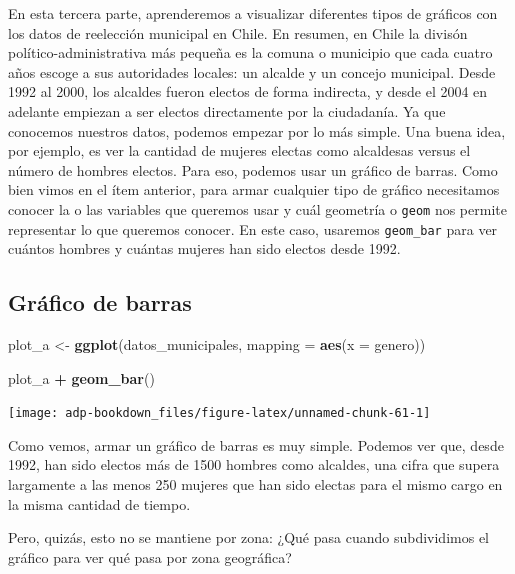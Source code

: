\documentclass[]{book}
\newenvironment{Shaded}{\begin{snugshade}}{\end{snugshade}}
\newcommand{\DataTypeTok}[1]{\textcolor[rgb]{0.13,0.29,0.53}{#1}}
\newcommand{\KeywordTok}[1]{\textcolor[rgb]{0.13,0.29,0.53}{\textbf{#1}}}
\newcommand{\NormalTok}[1]{#1}
\newcommand{\OperatorTok}[1]{\textcolor[rgb]{0.81,0.36,0.00}{\textbf{#1}}}
\newcommand{\StringTok}[1]{\textcolor[rgb]{0.31,0.60,0.02}{#1}}
\begin{document}
En esta tercera parte, aprenderemos a visualizar diferentes tipos de
gráficos con los datos de reelección municipal en Chile. En resumen, en
Chile la divisón político-administrativa más pequeña es la comuna o
municipio que cada cuatro años escoge a sus autoridades locales: un
alcalde y un concejo municipal. Desde 1992 al 2000, los alcaldes fueron
electos de forma indirecta, y desde el 2004 en adelante empiezan a ser
electos directamente por la ciudadanía. Ya que conocemos nuestros datos,
podemos empezar por lo más simple. Una buena idea, por ejemplo, es ver
la cantidad de mujeres electas como alcaldesas versus el número de
hombres electos. Para eso, podemos usar un gráfico de barras. Como bien
vimos en el ítem anterior, para armar cualquier tipo de gráfico
necesitamos conocer la o las variables que queremos usar y cuál
geometría o \texttt{geom} nos permite representar lo que queremos
conocer. En este caso, usaremos \texttt{geom\_bar} para ver cuántos
hombres y cuántas mujeres han sido electos desde 1992.

\hypertarget{grafico-de-barras}{%
\subsection{Gráfico de barras}\label{grafico-de-barras}}

\begin{Shaded}
\begin{Highlighting}[]
\NormalTok{plot_a <-}\StringTok{ }\KeywordTok{ggplot}\NormalTok{(datos_municipales, }\DataTypeTok{mapping =} \KeywordTok{aes}\NormalTok{(}\DataTypeTok{x =}\NormalTok{ genero))}

\NormalTok{plot_a }\OperatorTok{+}\StringTok{ }\KeywordTok{geom_bar}\NormalTok{()}
\end{Highlighting}
\end{Shaded}

\begin{center}\texttt{[image: adp-bookdown\_files/figure-latex/unnamed-chunk-61-1]} \end{center}

Como vemos, armar un gráfico de barras es muy simple. Podemos ver que,
desde 1992, han sido electos más de 1500 hombres como alcaldes, una
cifra que supera largamente a las menos 250 mujeres que han sido electas
para el mismo cargo en la misma cantidad de tiempo.

Pero, quizás, esto no se mantiene por zona: ¿Qué pasa cuando
subdividimos el gráfico para ver qué pasa por zona geográfica?
\end{document}
